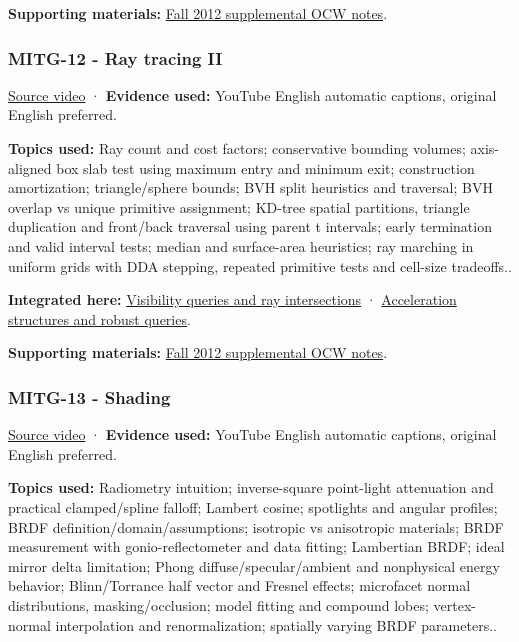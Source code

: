 \textbf{Supporting materials:} \href{https://ocw.mit.edu/courses/6-837-computer-graphics-fall-2012/pages/lecture-notes/}{Fall 2012 supplemental OCW notes}.

\subsubsection{MITG-12 - Ray tracing II}\label{04-visual-computing-ii-ch036-mitg-12---ray-tracing-ii}

\href{https://www.youtube.com/watch?v=mr_fHXW2YxE}{Source video} · \textbf{Evidence used:} YouTube English automatic captions, original English preferred.

\textbf{Topics used:} Ray count and cost factors; conservative bounding volumes; axis-aligned box slab test using maximum entry and minimum exit; construction amortization; triangle/sphere bounds; BVH split heuristics and traversal; BVH overlap vs unique primitive assignment; KD-tree spatial partitions, triangle duplication and front/back traversal using parent t intervals; early termination and valid interval tests; median and surface-area heuristics; ray marching in uniform grids with DDA stepping, repeated primitive tests and cell-size tradeoffs..

\textbf{Integrated here:} \hyperref[04-visual-computing-ii-ch028-visibility-queries-and-ray-intersections-1]{Visibility queries and ray intersections} · \hyperref[04-visual-computing-ii-ch029-acceleration-structures-and-robust-queries-1]{Acceleration structures and robust queries}.

\textbf{Supporting materials:} \href{https://ocw.mit.edu/courses/6-837-computer-graphics-fall-2012/pages/lecture-notes/}{Fall 2012 supplemental OCW notes}.

\subsubsection{MITG-13 - Shading}\label{04-visual-computing-ii-ch036-mitg-13---shading}

\href{https://www.youtube.com/watch?v=0xmeaXs5-ZU}{Source video} · \textbf{Evidence used:} YouTube English automatic captions, original English preferred.

\textbf{Topics used:} Radiometry intuition; inverse-square point-light attenuation and practical clamped/spline falloff; Lambert cosine; spotlights and angular profiles; BRDF definition/domain/assumptions; isotropic vs anisotropic materials; BRDF measurement with gonio-reflectometer and data fitting; Lambertian BRDF; ideal mirror delta limitation; Phong diffuse/specular/ambient and nonphysical energy behavior; Blinn/Torrance half vector and Fresnel effects; microfacet normal distributions, masking/occlusion; model fitting and compound lobes; vertex-normal interpolation and renormalization; spatially varying BRDF parameters..

